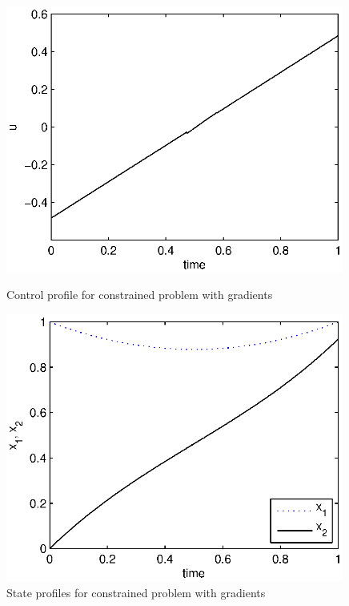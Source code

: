 \begin{figure}[htb]
\begin{minipage}[t]{0.5\linewidth}
\centering
\includegraphics[width=0.99\textwidth]{examples/problem1b/graphs/u_624a.eps}
\caption[Tutorial example 2: control profile]{Control profile for
  constrained problem with gradients} \label{fig:prob1b_u} 
\end{minipage}
\begin{minipage}[t]{0.5\linewidth}
\centering
\includegraphics[width=0.99\textwidth]{examples/problem1b/graphs/x12_624a.eps}
\caption[Tutorial example 2: state profiles]{State profiles for
  constrained problem with gradients} \label{fig:prob1b_x} 
\end{minipage}
\end{figure}

